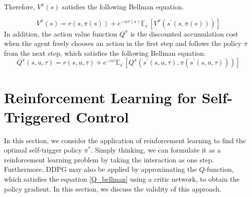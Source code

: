 \documentclass[english, dvipdfmx]{ampmt}             %
\newcommand{\expect}{\mathbb{E}}
\begin{document}
Therefore, $V^{\pi}(s)$ satisfies the following Bellman equation. \par
\begin{equation}
	V^{\pi}(s) = r(s,\pi(s)) + e^{-\alpha\tau(s)}\expect_{s^{\prime}}[V^{\pi}(s^{\prime}(s,\pi(s)))] \label{bellman}
\end{equation}
In addition, the action value function $Q^{\pi}$ is the discounted accumulation cost when the agent freely chooses an action in the first step and follows the policy $\pi$ from the next step, which satisfies the following Bellman equation.
\begin{equation}
	Q^{\pi}(s,u,\tau) = r(s,u,\tau) + e^{-\alpha\tau}\expect_{s^{\prime}}[Q^{\pi}(s^{\prime}(s,u,\tau), \pi(s^{\prime}(s,u,\tau)))] \label{Q_bellman}
\end{equation}


\section{Reinforcement Learning for Self-Triggered Control}
In this section, we consider the application of reinforcement learning to find the optimal self-trigger policy $\pi^{*}$. Simply thinking, we can formulate it as a reinforcement learning problem by taking the interaction as one step. Furthermore, DDPG may also be applied by approximating the $Q$-function, which satisfies the equation \eqref{Q_bellman} using a critic network, to obtain the policy gradient. In this section, we discuss the validity of this approach.
\end{document}
